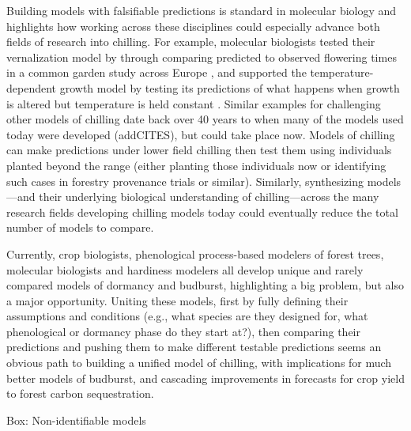 \documentclass[11pt]{article}
\begin{document}
Building models with falsifiable predictions is standard in molecular biology and highlights how working across these disciplines could especially advance both fields of research into chilling. For example, molecular biologists tested their vernalization model by through comparing predicted to observed flowering times in a common garden study across Europe \citep[][]{Wilczek:2009oa}, and supported the temperature-dependent growth model by testing its predictions of what happens when growth is altered but temperature is held constant \citep{zhao2020temperature}. Similar examples for challenging other models of chilling date back over 40 years to when many of the models used today were developed (addCITES), but could take place now. Models of chilling can make predictions under lower field chilling then test them using individuals planted beyond the range (either planting those individuals now or identifying such cases in forestry provenance trials or similar). Similarly, synthesizing models---and their underlying biological understanding of chilling---across the many research fields developing chilling models today could eventually reduce the total number of models to compare. 

Currently, crop biologists, phenological process-based modelers of forest trees, molecular biologists and hardiness modelers all develop unique and rarely compared models of dormancy and budburst, highlighting a big problem, but also a major opportunity. Uniting these models, first by fully defining their assumptions and conditions (e.g., what species are they designed for, what phenological or dormancy phase do they start at?), then comparing their predictions and pushing them to make different testable predictions seems an obvious path to building a unified model of chilling, with implications for much better models of budburst, and cascading improvements in forecasts for crop yield to forest carbon sequestration. 




\vspace{10ex}

{\sc Box: Non-identifiable models} %
\end{document}
